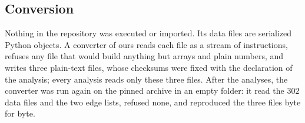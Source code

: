 \documentclass[aps,prx,onecolumn,10pt,nofootinbib,longbibliography,floatfix]{revtex4-2}
\theoremstyle{remark}
\begin{document}
\subsection{Conversion}
Nothing in the repository was executed or imported. Its data files are serialized Python objects. A converter of
ours reads each file as a stream of instructions, refuses any file that would build anything but arrays and plain
numbers, and writes three plain-text files, whose checksums were fixed with the declaration of the analysis; every
analysis reads only these three files. After the analyses, the converter was run again on the pinned archive in an
empty folder: it read the $302$ data files and the two edge lists, refused none, and reproduced the three files byte %
for byte.
\end{document}
